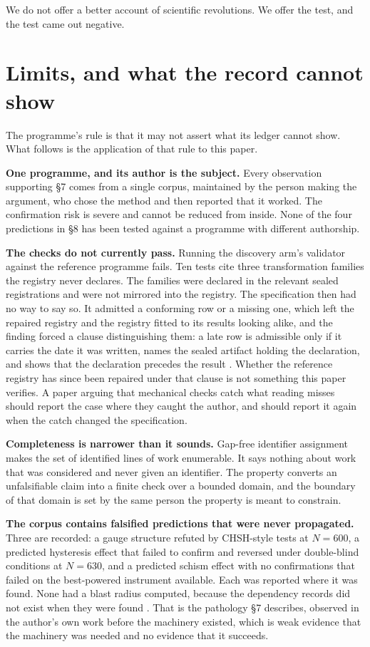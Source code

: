 \documentclass[11pt,letterpaper]{article}
\begin{document}
We do not offer a better account of scientific revolutions. We offer the test,
and the test came out negative.

\section{Limits, and what the record cannot show}

The programme's rule is that it may not assert what its ledger cannot show. What
follows is the application of that rule to this paper.

\textbf{One programme, and its author is the subject.} Every observation
supporting \S7 comes from a single corpus, maintained by the person making the
argument, who chose the method and then reported that it worked. The
confirmation risk is severe and cannot be reduced from inside. None of the four
predictions in \S8 has been tested against a programme with different
authorship.

\textbf{The checks do not currently pass.} Running the discovery arm's validator
against the reference programme fails. Ten tests cite three transformation
families the registry never declares. The families were declared in the relevant
sealed registrations and were not mirrored into the registry. The specification
then had no way to say so. It admitted a conforming row or a missing one, which
left the repaired registry and the registry fitted to its results looking alike,
and the finding forced a clause distinguishing them: a late row is admissible
only if it carries the date it was written, names the sealed artifact holding the
declaration, and shows that the declaration precedes the result
\citep{pedsc}. Whether the reference registry has since been repaired under that
clause is not something this paper verifies. A paper arguing that mechanical
checks catch what reading misses should report the case where they caught the
author, and should report it again when the catch changed the specification.

\textbf{Completeness is narrower than it sounds.} Gap-free identifier assignment
makes the set of identified lines of work enumerable. It says nothing about work
that was considered and never given an identifier. The property converts an
unfalsifiable claim into a finite check over a bounded domain, and the boundary
of that domain is set by the same person the property is meant to constrain.

\textbf{The corpus contains falsified predictions that were never propagated.}
Three are recorded: a gauge structure refuted by CHSH-style tests at
\(N=600\), a predicted hysteresis effect that failed to confirm and reversed
under double-blind conditions at \(N=630\), and a predicted schism effect with no
confirmations that failed on the best-powered instrument available. Each was
reported where it was found. None had a blast radius computed, because the
dependency records did not exist when they were found
\citep{casebrownfield}. That is the pathology \S7 describes, observed in the
author's own work before the machinery existed, which is weak evidence that the
machinery was needed and no evidence that it succeeds.
\end{document}

